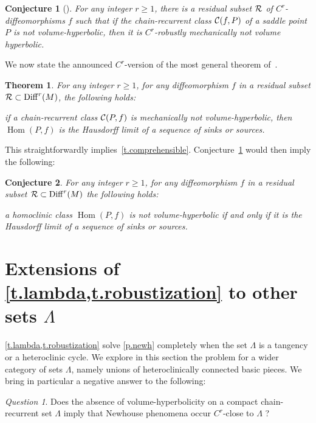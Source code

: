 \documentclass[11pt, a4paper]{amsart}
\theoremstyle{plain}
\newtheorem{theorem}{Theorem} %
\newtheorem{conjecture}{Conjecture}[proposition]
\theoremstyle{definition}
\theoremstyle{remark}
\newtheorem{question}[proposition]{Question}
\numberwithin{equation}{section}         %
\DeclareMathOperator{\Diff}{{Diff}}
\def\Diff{\operatorname{Diff}}
\def\Hom{\operatorname{Hom}}
\begin{document}
\begin{conjecture}[]\label{c.volhyp}
For any integer $r\geq 1$, there is a residual subset ${\mathcal R}$ of $C^r$-diffeomorphisms $f$ such that if the chain-recurrent class ${\mathcal C}(f,P)$ of a saddle point $P$ is not volume-hyperbolic, then it is $C^r$-robustly mechanically not volume hyperbolic. 
\end{conjecture}

We now state the announced $C^r$-version of the most general theorem of~\cite{BDP}. 

\begin{theorem}\label{t.mechnovolhyp}
For any integer $r\geq 1$, for any diffeomorphism $f$ in a residual subset $\cR \subset \Diff^r(M)$, the following holds:

if a chain-recurrent class ${\mathcal C}(P,f)$ is mechanically not volume-hyperbolic, then $\Hom(P,f)$ is the Hausdorff limit of a sequence of sinks or sources.
\end{theorem}

This straightforwardly implies~\cref{t.comprehensible}. Conjecture~\ref{c.volhyp} would then imply the following:

\begin{conjecture}
For any integer $r\geq 1$, for any diffeomorphism $f$ in a residual subset $\cR \subset \Diff^r(M)$ the following holds:

a homoclinic class $\Hom(P,f)$ is not volume-hyperbolic if and only if it is the Hausdorff limit of a sequence of sinks or sources.
\end{conjecture}


\section{Extensions of \cref{t.lambda,t.robustization} to other sets $\Lambda$}\label{s.moregenerallambda}

\cref{t.lambda,t.robustization}  solve \cref{p.newh} completely when the set $\Lambda$ is a tangency or a heteroclinic cycle. 
We explore in this section the problem for a wider category of sets $\Lambda$, namely unions of heteroclinically connected basic pieces.  We bring in particular a negative answer to the following:

\begin{question}\label{q.lambda}
Does the absence of volume-hyperbolicity on a compact chain-recurrent set $\Lambda$ imply that Newhouse phenomena occur $C^r$-close to $\Lambda$ ? 
\end{question}
\end{document}
